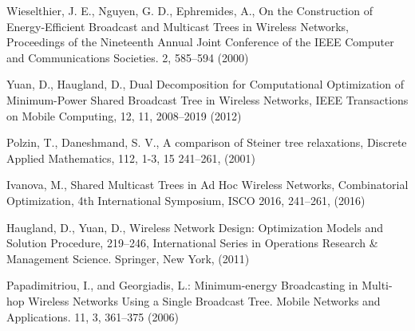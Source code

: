 

\begin{thebibliography}{}
%
%
Wieselthier,  J. E., Nguyen, G. D., Ephremides, A.,
On the Construction of Energy-Efficient Broadcast and Multicast Trees in Wireless Networks,
Proceedings of the Nineteenth Annual Joint Conference of the IEEE Computer and Communications Societies.
2, 585--594 (2000)

Yuan, D., Haugland, D.,
Dual Decomposition for Computational Optimization of Minimum-Power Shared Broadcast Tree in Wireless Networks,
IEEE Transactions on Mobile Computing,
12, 11, 2008--2019 (2012)

Polzin, T., Daneshmand, S. V., A comparison of Steiner tree relaxations, Discrete Applied Mathematics, 112,  1-3, 15 241--261, (2001)

Ivanova, M., Shared Multicast Trees in Ad Hoc Wireless Networks, Combinatorial Optimization, 4th International Symposium, ISCO 2016, 241--261, (2016)

Haugland, D., Yuan, D.,
Wireless Network Design: Optimization Models and Solution Procedure, 219--246,
International Series in Operations Research \& Management Science.
Springer, New York, (2011)

Papadimitriou, I., and Georgiadis, L.:
Minimum-energy Broadcasting in Multi-hop Wireless Networks Using a Single Broadcast Tree.
Mobile Networks and Applications.
11, 3, 361--375 (2006)

\end{thebibliography}



